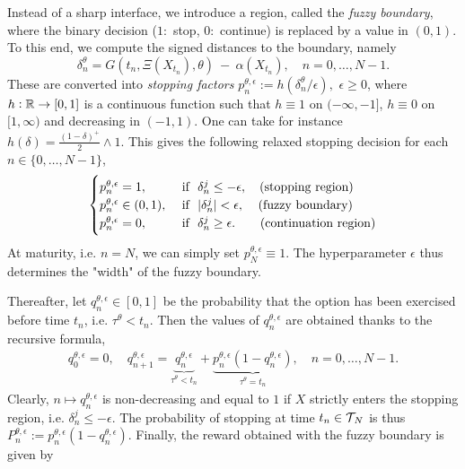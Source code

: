 Instead of a sharp interface, we introduce a region,  called the \textit{fuzzy boundary}, where the binary decision ($1:$  stop, $0:$ continue) is replaced by a value in $(0,1)$. 
To this end,  we compute the signed distances to the boundary, namely
 \begin{equation}
     \delta^{\theta}_n =  G(t_n,\Xi(X_{t_n}),\theta) \ - \ \alpha(X_{t_n}), \quad n=0,\ldots ,N-1. 
 \end{equation}
 These are converted into \textit{stopping factors}  
$p^{\theta,\epsilon}_n := h(\delta^{\theta}_n /\epsilon), $ $\epsilon \ge 0$, where $h:\operatorname{\mathbb{R}} \to [0,1]$ is a continuous function such that $h \equiv 1$ on $(-\infty,-1]$,  $h \equiv 0$ on $[1,\infty)$ and decreasing in $(-1,1)$. One can take for instance $h(\delta) = \frac{(1-\delta)^+ }{2} \wedge 1$. This gives the following  relaxed stopping decision for each $n\in\{0,\ldots,N-1\}$, 
$$ \begin{cases}
p^{\theta,\epsilon}_n = 1, & \text{ if } \  \delta^j_n \le -\epsilon,  \quad \text{(stopping region)}\\%
p^{\theta,\epsilon}_n \in (0,1), & \text{ if } \   |\delta_n^{j}| < \epsilon, \hspace{0.4 mm} \quad \text{(fuzzy boundary)}\\
p^{\theta,\epsilon}_n = 0, & \text{ if } \  \delta^j_n \ge \epsilon. 
\hspace{3.5 mm} \quad \text{(continuation region)}
\end{cases} $$
At maturity, i.e.  $n=N$, we can simply set $p^{\theta,\epsilon}_N \equiv 1$. 
The hyperparameter $\epsilon$ thus determines the "width" of the fuzzy boundary. 

Thereafter, let $q^{\theta,\epsilon}_{n} \in [0,1]$ be the probability that the option has been exercised before time $t_n$, i.e. $\tau^{\theta} < t_n$. Then the values of $q^{\theta,\epsilon}_{n}$  are obtained thanks to the recursive formula, 
\begin{align}\label{eq:recStop}
     q^{\theta,\epsilon}_{0} = 0, \quad 
     q^{\theta,\epsilon}_{n+1}
     = \underbrace{q^{\theta,\epsilon}_{n}}_{ \tau^{\theta} < t_n} + \underbrace{p^{\theta,\epsilon}_{n}(1-q^{\theta,\epsilon}_{n})}_{\tau^{\theta} = t_n}, \quad n = 0, \ldots, N-1. 
\end{align}
Clearly, $n \mapsto q^{\theta,\epsilon}_{n}$ is non-decreasing and equal to $1$ if $X$ strictly enters the stopping region, i.e.  $\delta^j_n \le -\epsilon$.   
The probability of stopping at time $t_n \in \operatorname{\mathcal{T}}_{\!N}$  is thus $P^{\theta,\epsilon}_{n} := p^{\theta,\epsilon}_{n}(1-q^{\theta,\epsilon}_{n})$. Finally,  the  reward obtained with the  fuzzy boundary is given by 

